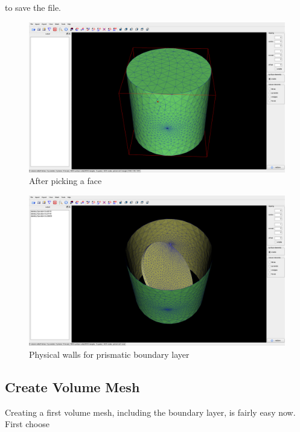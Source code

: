 
to save the file. 

\begin{figure}
  \begin{centering}
    \includegraphics[width=14cm]{figures/tutorials/T1/scr02}
    \par
  \end{centering}
  \caption{After picking a face}
  \label{fig:T1_scr02}
\end{figure}

\begin{figure}
  \begin{centering}
    \includegraphics[width=14cm]{figures/tutorials/T1/scr03}
    \par
  \end{centering}
  \caption{Physical walls for prismatic boundary layer}
  \label{fig:T1_scr03}
\end{figure}

\clearpage
\subsection{Create Volume Mesh}
Creating a first volume mesh, including the boundary layer, is fairly easy now. First choose

